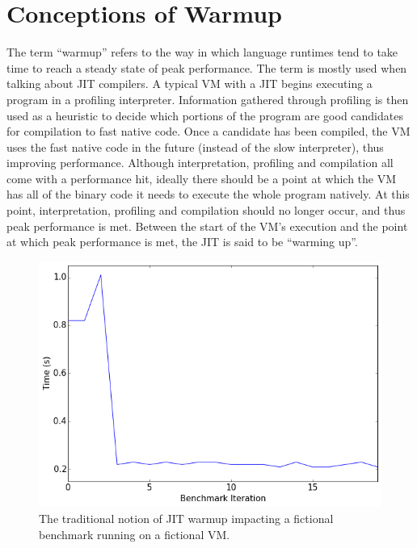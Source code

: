 \documentclass[10pt,preprint]{sigplanconf}
\begin{document}
\section{Conceptions of Warmup}
\label{sec:Conceptions of Warmup}

The term ``warmup'' refers to the way in which language runtimes tend to take
time to reach a steady state of peak performance. The term is mostly used when
talking about JIT compilers. A typical VM
with a JIT begins executing a program in a profiling interpreter. Information
gathered through profiling is then used as a heuristic to decide which portions
of the program are good candidates for compilation to fast native code. Once a
candidate has been compiled, the VM uses the fast native code in the future
(instead of the slow interpreter), thus improving performance.  Although
interpretation, profiling and compilation all come with a performance hit,
ideally there should be a point at which the VM has all of the binary code it
needs to execute the whole program natively. At this point, interpretation,
profiling and compilation should no longer occur, and thus peak performance is
met. Between the start of the VM's execution and the point at which peak
performance is met, the JIT is said to be ``warming up''.

\begin{figure}[h!]
\centering
\includegraphics[width=.4\textwidth]{img/trad}
\caption{The traditional notion of JIT warmup impacting a fictional
benchmark running on a fictional VM.}
\label{fig:trad}
\end{figure}
\end{document}
